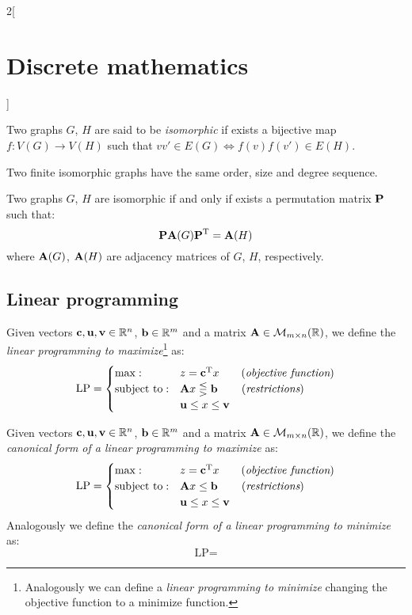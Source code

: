 \documentclass[../../../main_math.tex]{subfiles}
\begin{document}
\begin{multicols}{2}[\section{Discrete mathematics}]
\begin{definition}
    Two graphs $G$, $H$ are said to be \emph{isomorphic} if exists a bijective map $f:V(G)\rightarrow V(H)$ such that $vv'\in E(G)\iff f(v)f(v')\in E(H)$.
  \end{definition}
  \begin{proposition}
    Two finite isomorphic graphs have the same order, size and degree sequence.
  \end{proposition}
  \begin{theorem}
    Two graphs $G$, $H$ are isomorphic if and only if exists a permutation matrix $\boldsymbol{\mathrm{P}}$ such that: $$\boldsymbol{\mathrm{P}}\boldsymbol{\mathrm{A}}(G){\boldsymbol{\mathrm{P}}}^{\mathrm{T}}=\boldsymbol{\mathrm{A}}(H)$$ where $\boldsymbol{\mathrm{A}}(G)$, $\boldsymbol{\mathrm{A}}(H)$ are adjacency matrices of $G$, $H$, respectively.
  \end{theorem}
  \subsection{Linear programming}
  \begin{definition}
    Given vectors $\boldsymbol{\mathrm{c}},\boldsymbol{\mathrm{u}},\boldsymbol{\mathrm{v}}\in\mathbb{R} ^n$, $\boldsymbol{\mathrm{b}}\in\mathbb{R} ^m$ and a matrix $\boldsymbol{\mathrm{A}}\in\mathcal{M}_{m\times n}(\mathbb{R} )$, we define the \emph{linear programming to maximize}\footnote{Analogously we can define a \emph{linear programming to minimize} changing the objective function to a minimize function.} as: $$\text{LP}=
      \begin{cases}
        \max:              & z={\boldsymbol{\mathrm{c}}}^{\mathrm{T}}x\qquad    (\emph{objective function}) \\
        \text{subject to}: & \boldsymbol{\mathrm{A}}x\lesseqgtr \boldsymbol{\mathrm{b}}\qquad\, (\emph{restrictions})     \\
                           & \boldsymbol{\mathrm{u}}\leq x\leq \boldsymbol{\mathrm{v}}
      \end{cases}$$
  \end{definition}
  \begin{definition}
    Given vectors $\boldsymbol{\mathrm{c}},\boldsymbol{\mathrm{u}},\boldsymbol{\mathrm{v}}\in\mathbb{R} ^n$, $\boldsymbol{\mathrm{b}}\in\mathbb{R} ^m$ and a matrix $\boldsymbol{\mathrm{A}}\in\mathcal{M}_{m\times n}(\mathbb{R} )$, we define the \emph{canonical form of a linear programming to maximize} as: $$\text{LP}=
      \begin{cases}
        \max:              & z={\boldsymbol{\mathrm{c}}}^{\mathrm{T}}x\qquad   (\emph{objective function}) \\
        \text{subject to}: & \boldsymbol{\mathrm{A}}x\leq \boldsymbol{\mathrm{b}}\qquad\,      (\emph{restrictions} )    \\
                           & \boldsymbol{\mathrm{u}}\leq x\leq \boldsymbol{\mathrm{v}}
      \end{cases}$$
    Analogously we define the \emph{canonical form of a linear programming to minimize} as: $$\text{LP}=
$$
\end{definition}
\end{multicols}
\end{document}
